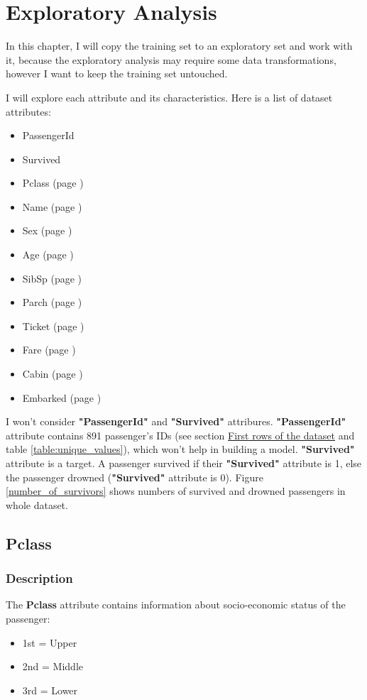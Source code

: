 \chapter{Exploratory Analysis}
In this chapter, I will copy the training  set to an exploratory set and 
work with it, because the exploratory analysis may require some data 
transformations, however I want to keep the training set untouched.

I will explore each attribute and its characteristics. Here is a list of
dataset attributes:
\begin{itemize}
	\item PassengerId
    \item Survived
    \item Pclass (page \pageref{section:Pclass})
    \item Name (page \pageref{section:Name})
    \item Sex (page \pageref{section:Sex})
    \item Age (page \pageref{section:Age})
    \item SibSp (page \pageref{section:SibSp})
    \item Parch (page \pageref{section:Parch})
    \item Ticket (page \pageref{section:Ticket})
    \item Fare (page \pageref{section:Fare})
    \item Cabin (page \pageref{section:Cabin})
    \item Embarked (page \pageref{section:Embarked})
\end{itemize}

I won't consider \textbf{"PassengerId"} and \textbf{"Survived"} attribures.
\textbf{"PassengerId"} attribute contains 891 passenger's IDs (see section 
\hyperref[section:first_rows]{First rows of the dataset} and table 
\ref{table:unique_values}), which won't help in building a model.
\textbf{"Survived"} attribute is a target. A passenger survived if their 
\textbf{"Survived"} attribute is 1, else the passenger drowned 
(\textbf{"Survived"} attribute is 0). Figure \ref{number_of_survivors}
shows numbers of survived and drowned passengers in whole dataset.


\section{Pclass} \label{section:Pclass}

\subsection{Description}
The \textbf{Pclass} attribute contains information about socio-economic
status of the passenger:
\begin{itemize}
    \item 1st = Upper
    \item 2nd = Middle
    \item 3rd = Lower
\end{itemize}

